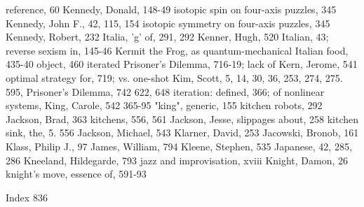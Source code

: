   reference, 60                                   Kennedy, Donald, 148-49
isotopic spin on four-axis puzzles, 345           Kennedy, John F., 42, 115, 154
isotopic symmetry on four-axis puzzles, 345       Kennedy, Robert, 232
Italia, 'g' of, 291, 292                          Kenner, Hugh, 520
Italian, 43; reverse sexism in, 145-46            Kermit the Frog, as quantum-mechanical
Italian food, 435-40                               object, 460
iterated Prisoner's Dilemma, 716-19; lack of      Kern, Jerome, 541
  optimal strategy for, 719; vs. one-shot         Kim, Scott, 5, 14, 30, 36, 253, 274, 275. 595,
  Prisoner's Dilemma, 742                          622, 648
iteration: defined, 366; of nonlinear systems,    King, Carole, 542
  365-95                                          "king", generic, 155
                                                  kitchen robots, 292
Jackson, Brad, 363                                kitchens, 556, 561
Jackson, Jesse, slippages about, 258              kitchen sink, the, 5. 556
Jackson, Michael, 543                             Klarner, David, 253
Jacowski, Bronob, 161                             Klass, Philip J., 97
James, William, 794                               Kleene, Stephen, 535
Japanese, 42, 285, 286                            Kneeland, Hildegarde, 793
jazz and improvisation, xviii                     Knight, Damon, 26
                                                  knight's move, essence of, 591-93

 Index                                                                                       836


